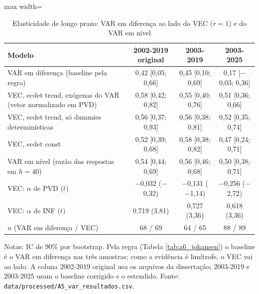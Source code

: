 \begin{table}[htbp]
\centering
\caption{Elasticidade de longo prazo: VAR em diferen\c{c}a ao lado do VEC ($r = 1$) e do VAR em n\'ivel}
\label{tab:a6_var_vec}
\scriptsize
\begin{adjustbox}{max width=\linewidth}
\begin{tabular}{lccc}
\toprule
Modelo & 2002-2019 original & 2003-2019 & 2003-2025 \\
\midrule
VAR em diferen\c{c}a (baseline pela regra) & 0{,}42 [0{,}05; 0{,}66] & 0{,}45 [0{,}10; 0{,}69] & 0{,}17 [$-$0{,}03; 0{,}36] \\
VEC, ecdet trend, ex\'ogenas do VAR (vetor normalizado em PVD) & 0{,}58 [0{,}42; 0{,}82] & 0{,}55 [0{,}40; 0{,}76] & 0{,}51 [0{,}36; 0{,}66] \\
VEC, ecdet trend, s\'o dummies determin\'isticas & 0{,}56 [0{,}37; 0{,}93] & 0{,}56 [0{,}38; 0{,}81] & 0{,}52 [0{,}35; 0{,}74] \\
VEC, ecdet const & 0{,}52 [0{,}39; 0{,}68] & 0{,}58 [0{,}38; 0{,}82] & 0{,}47 [0{,}24; 0{,}71] \\
VAR em n\'ivel (raz\~ao das respostas em $h = 40$) & 0{,}54 [0{,}44; 0{,}69] & 0{,}56 [0{,}46; 0{,}68] & 0{,}50 [0{,}38; 0{,}71] \\
VEC: $\alpha$ de PVD ($t$) & $-$0{,}032 ($-$0{,}32) & $-$0{,}131 ($-$1{,}14) & $-$0{,}256 ($-$2{,}72) \\
VEC: $\alpha$ de INF ($t$) & 0{,}719 (3{,}81) & 0{,}727 (3{,}36) & 0{,}618 (3{,}36) \\
$n$ (VAR em diferen\c{c}a / VEC) & 68 / 69 & 64 / 65 & 88 / 89 \\
\bottomrule
\end{tabular}
\end{adjustbox}
\begin{minipage}{0.97\linewidth}\footnotesize
\medskip Notas: IC de 90\% por bootstrap. Pela regra (Tabela \ref{tab:a6_johansen}) o baseline \'e o VAR em diferen\c{c}a nas tr\^es amostras; como a evid\^encia \'e lim\'itrofe, o VEC vai ao lado. A coluna 2002-2019 original usa os arquivos da disserta\c{c}\~ao; 2003-2019 e 2003-2025 usam o baseline corrigido e o estendido. Fonte: \texttt{data/processed/A5\_var\_resultados.csv}.
\end{minipage}
\end{table}

